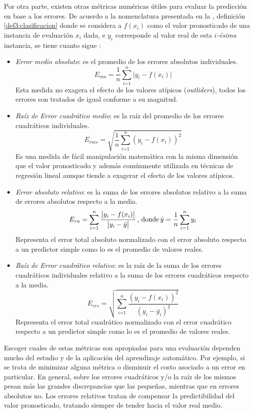 Por otra parte, existen otras métricas numéricas útiles para evaluar
la predicción en base a los errores. De acuerdo a la nomenclatura
presentada en la , definición \ref{def3:clasificacion}
donde se considera a $f(x_{i})$ como el valor pronosticado de una
instancia de evaluación $x_{i}$ dada, e $y_{i}$ corresponde al valor
real de esta \emph{$i$-ésima} instancia, se tiene cuanto sigue \cite{Witten2017}:
\begin{itemize}
\item \emph{Error medio absoluto}: es el promedio de los errores absolutos
individuales.
\[
E_{ma}=\frac{1}{n}\sum_{i\text{=1}}^{n}\bigl|y_{i}-f(x_{i})\bigr|
\]
Esta medida no exagera el efecto de los valores atípicos (\emph{outliders}),
todos los errores son tratados de igual conforme a su magnitud.
\item \emph{Raíz de Error cuadrático medio}: es la raíz del promedio de
los errores cuadráticos individuales.
\[
E_{rms}=\sqrt{\frac{1}{n}\sum_{i\text{=1}}^{n}\left(y_{i}-f(x_{i})\right)^{2}}
\]
Es una medida de fácil manipulación matemática con la misma dimensión
que el valor pronosticado y además comúnmente utilizada en técnicas
de regresión lineal aunque tiende a exagerar el efecto de los valores
atípicos.
\item \emph{Error absoluto relativo}: es la suma de los errores absolutos
relativo a la suma de errores absolutos respecto a la media.
\[
E_{ra}=\sum_{i\text{=1}}^{n}\frac{\bigl|y_{i}-f(x_{i})\bigr|}{\bigl|y_{i}-\bar{y}\bigr|}\,\textrm{, donde\,}\bar{y}=\frac{1}{n}\sum_{i=1}^{n}y_{i}
\]
Representa el error total absoluto normalizado con el error absoluto
respecto a un predictor simple como lo es el promedio de valores reales.
\item \emph{Raíz de Error cuadrático relativo}: es la raíz de la suma de
los errores cuadráticos individuales relativo a la suma de los errores
cuadráticos respecto a la media. 
\[
E_{rrs}=\sqrt{\sum_{i\text{=1}}^{n}\frac{\left(y_{i}-f(x_{i})\right)^{2}}{\left(y_{i}-\bar{y_{i}}\right)^{2}}}
\]
Representa el error total cuadrático normalizado con el error cuadrático
respecto a un predictor simple como lo es el promedio de valores reales.
\end{itemize}
Escoger cuales de estas métricas son apropiadas para una evaluación
dependen mucho del estudio y de la aplicación del aprendizaje automático.
Por ejemplo, si se trata de minimizar alguna métrica o disminuir el
costo asociado a un error en particular. En general, sobre los errores
cuadráticos y/o la raíz de los mismos pesan más las grandes discrepancias
que las pequeñas, mientras que en errores absolutos no. Los errores
relativos tratan de compensar la predictibilidad del valor pronosticado,
tratando siempre de tender hacia el valor real medio. 

